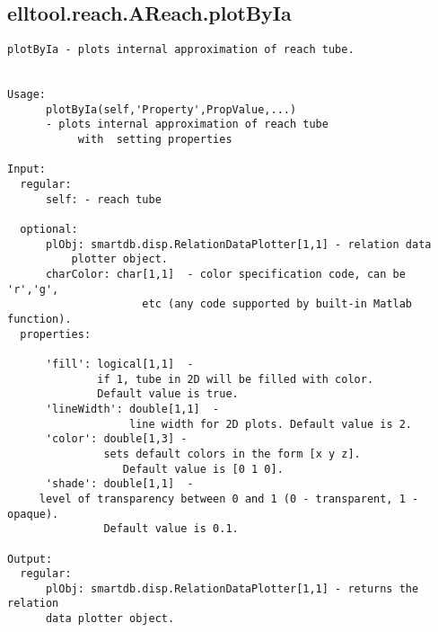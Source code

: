 \subsection{\texorpdfstring{elltool.reach.AReach.plotByIa}{plotByIa}}\label{method:elltool.reach.AReach.plotByIa}
\begin{verbatim}
plotByIa - plots internal approximation of reach tube.


Usage:
      plotByIa(self,'Property',PropValue,...)
      - plots internal approximation of reach tube
           with  setting properties

Input:
  regular:
      self: - reach tube

  optional:
      plObj: smartdb.disp.RelationDataPlotter[1,1] - relation data
          plotter object.
      charColor: char[1,1]  - color specification code, can be 'r','g',
                     etc (any code supported by built-in Matlab function).
  properties:

      'fill': logical[1,1]  -
              if 1, tube in 2D will be filled with color.
              Default value is true.
      'lineWidth': double[1,1]  -
                   line width for 2D plots. Default value is 2.
      'color': double[1,3] -
               sets default colors in the form [x y z].
                  Default value is [0 1 0].
      'shade': double[1,1]  -
     level of transparency between 0 and 1 (0 - transparent, 1 - opaque).
               Default value is 0.1.

Output:
  regular:
      plObj: smartdb.disp.RelationDataPlotter[1,1] - returns the relation
      data plotter object.
\end{verbatim}
